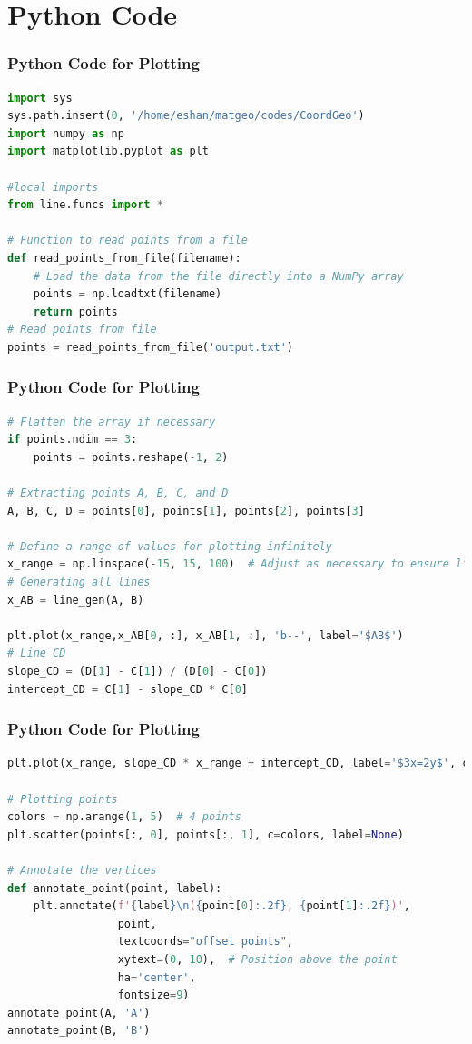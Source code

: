 \documentclass{beamer}
\theoremstyle{remark}
\numberwithin{equation}{section}
\begin{document}
\section{Python Code}
\begin{frame}[fragile]
\frametitle{Python Code for Plotting}
\begin{lstlisting}[language=Python]
import sys                                         
sys.path.insert(0, '/home/eshan/matgeo/codes/CoordGeo')      
import numpy as np
import matplotlib.pyplot as plt

#local imports
from line.funcs import *

# Function to read points from a file
def read_points_from_file(filename):
    # Load the data from the file directly into a NumPy array
    points = np.loadtxt(filename)
    return points
# Read points from file
points = read_points_from_file('output.txt')
\end{lstlisting}
\end{frame}
\begin{frame}[fragile]
\frametitle{Python Code for Plotting}
\begin{lstlisting}[language=Python]
# Flatten the array if necessary
if points.ndim == 3:
    points = points.reshape(-1, 2)

# Extracting points A, B, C, and D
A, B, C, D = points[0], points[1], points[2], points[3]

# Define a range of values for plotting infinitely
x_range = np.linspace(-15, 15, 100)  # Adjust as necessary to ensure lines extend sufficiently
# Generating all lines
x_AB = line_gen(A, B)

plt.plot(x_range,x_AB[0, :], x_AB[1, :], 'b--', label='$AB$')
# Line CD
slope_CD = (D[1] - C[1]) / (D[0] - C[0])
intercept_CD = C[1] - slope_CD * C[0]
\end{lstlisting}
\end{frame}
\begin{frame}[fragile]
\frametitle{Python Code for Plotting}
\begin{lstlisting}[language=Python]
plt.plot(x_range, slope_CD * x_range + intercept_CD, label='$3x=2y$', color='red')

# Plotting points
colors = np.arange(1, 5)  # 4 points
plt.scatter(points[:, 0], points[:, 1], c=colors, label=None)

# Annotate the vertices
def annotate_point(point, label):
    plt.annotate(f'{label}\n({point[0]:.2f}, {point[1]:.2f})',
                 point,
                 textcoords="offset points",
                 xytext=(0, 10),  # Position above the point
                 ha='center',
                 fontsize=9)              
annotate_point(A, 'A')
annotate_point(B, 'B')
\end{lstlisting}
\end{frame}
\end{document}
